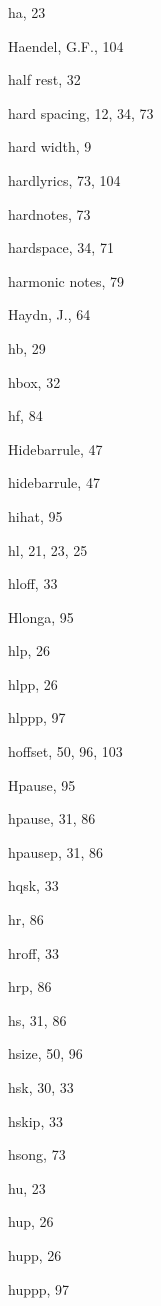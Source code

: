\begin{theindex}
  \item {\Bslash ha}, 23
  \item {\sc Haendel, G.F.}, 104
  \item half rest, 32
  \item hard spacing, 12, 34, 73
  \item hard width, 9
  \item {\Bslash hardlyrics}, 73, 104
  \item {\Bslash hardnotes}, 73
  \item {\Bslash hardspace}, 34, 71
  \item harmonic notes, 79
  \item {\sc Haydn, J.}, 64
  \item {\Bslash hb}, 29
  \item {\Bslash hbox}, 32
  \item {\Bslash hf}, 84
  \item {\Bslash Hidebarrule}, 47
  \item {\Bslash hidebarrule}, 47
  \item hihat, 95
  \item {\Bslash hl}, 21, 23, 25
  \item {\Bslash hloff}, 33
  \item {\Bslash Hlonga}, 95
  \item {\Bslash hlp}, 26
  \item {\Bslash hlpp}, 26
  \item {\Bslash hlppp}, 97
  \item {\Bslash hoffset}, 50, 96, 103
  \item {\Bslash Hpause}, 95
  \item {\Bslash hpause}, 31, 86
  \item {\Bslash hpausep}, 31, 86
  \item {\Bslash hqsk}, 33
  \item {\Bslash hr}, 86
  \item {\Bslash hroff}, 33
  \item {\Bslash hrp}, 86
  \item {\Bslash hs}, 31, 86
  \item {\Bslash hsize}, 50, 96
  \item {\Bslash hsk}, 30, 33
  \item {\Bslash hskip}, 33
  \item {\Bslash hsong}, 73
  \item {\Bslash hu}, 23
  \item {\Bslash hup}, 26
  \item {\Bslash hupp}, 26
  \item {\Bslash huppp}, 97


\end{theindex}
